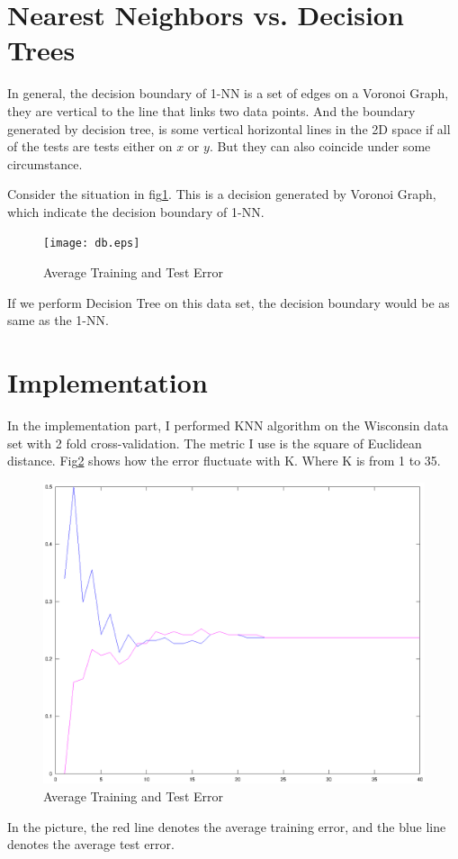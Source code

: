 \documentclass[a4paper, 12pt, titlepage]{article}
\begin{document}
\section{Nearest Neighbors vs. Decision Trees}
In general, the decision boundary of 1-NN is a set of edges on a Voronoi Graph, they are vertical to the line that links two data points. And the boundary generated by decision tree, is some vertical horizontal lines in the 2D space if all of the tests are tests either on $x$ or $y$. But they can also coincide under some circumstance. 

Consider the situation in fig\ref{db}. This is a decision generated by Voronoi Graph, which indicate the decision boundary of 1-NN. 
            \begin{figure}[H]
                \centering
                \texttt{[image: db.eps]}
                \caption{Average Training and Test Error}\label{db}
            \end{figure}
If we perform Decision Tree on this data set, the decision boundary would be as same as the 1-NN.

\section{Implementation}
In the implementation part, I performed KNN algorithm on the Wisconsin data set with 2 fold cross-validation. The metric I use is the square of Euclidean distance. Fig\ref{err} shows how the error fluctuate with K. Where K is from 1 to 35.
            \begin{figure}[H]
                \centering
                \includegraphics[width=12cm]{Q5.eps}
                \caption{Average Training and Test Error}\label{err}
            \end{figure}
In the picture, the red line denotes the average training error, and the blue line denotes the average test error.
\end{document}
